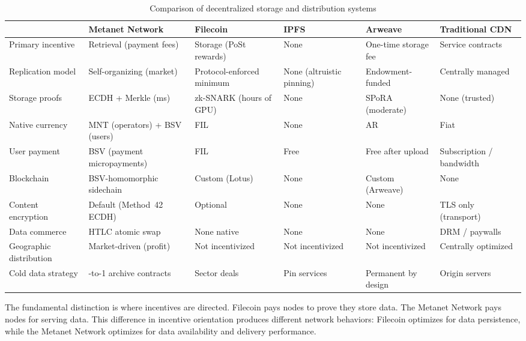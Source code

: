 \documentclass[11pt,a4paper]{article}
\begin{document}
\begin{table}[htbp]
\centering
\small
\setlength{\tabcolsep}{4pt}
\begin{tabularx}{\textwidth}{@{}l >{\raggedright\arraybackslash}X >{\raggedright\arraybackslash}X >{\raggedright\arraybackslash}X >{\raggedright\arraybackslash}X >{\raggedright\arraybackslash}X@{}}
\toprule
 & \textbf{Metanet Network} & \textbf{Filecoin} & \textbf{IPFS} & \textbf{Arweave} & \textbf{Traditional CDN} \\
\midrule
Primary incentive & Retrieval (payment fees) & Storage (PoSt rewards) & None & One-time storage fee & Service contracts \\
\addlinespace
Replication model & Self-organizing (market) & Protocol-enforced minimum & None (altruistic pinning) & Endowment-funded & Centrally managed \\
\addlinespace
Storage proofs & ECDH + Merkle (ms) & zk-SNARK (hours of GPU) & None & SPoRA (moderate) & None (trusted) \\
\addlinespace
Native currency & MNT (operators) + BSV (users) & FIL & None & AR & Fiat \\
\addlinespace
User payment & BSV (payment micropayments) & FIL & Free & Free after upload & Subscription / bandwidth \\
\addlinespace
Blockchain & BSV-homo\-morphic sidechain & Custom (Lotus) & None & Custom (Arweave) & None \\
\addlinespace
Content encryption & Default (Method~42 ECDH) & Optional & None & None & TLS only (transport) \\
\addlinespace
Data commerce & HTLC atomic swap & None native & None & None & DRM / paywalls \\
\addlinespace
Geographic distribution & Market-driven (profit) & Not incentivized & Not incentivized & Not incentivized & Centrally optimized \\
\addlinespace
Cold data strategy & 1-to-1 archive contracts & Sector deals & Pin services & Permanent by design & Origin servers \\
\bottomrule
\end{tabularx}
\caption{Comparison of decentralized storage and distribution systems}
\end{table}

The fundamental distinction is where incentives are directed. Filecoin pays nodes to prove they store data. The Metanet Network pays nodes for serving data. This difference in incentive orientation produces different network behaviors: Filecoin optimizes for data persistence, while the Metanet Network optimizes for data availability and delivery performance.
\end{document}
